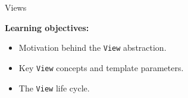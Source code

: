 
\begin{frame}[fragile]

  {\Huge Views}

  \vspace{20pt}

  \textbf{Learning objectives:}
  \begin{itemize}
    \item{Motivation behind the \texttt{View} abstraction.}
    \item{Key \texttt{View} concepts and template parameters.}
    \item{The \texttt{View} life cycle.}
  \end{itemize}

  \vspace{-20pt}

\end{frame}


